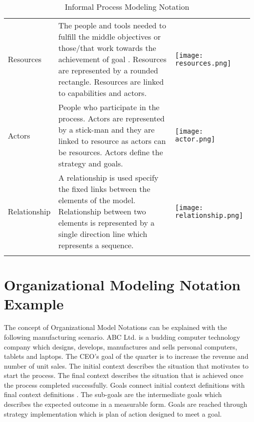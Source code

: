 \begin{center}
\begin{longtable}{p{3cm}p{10cm}p{3cm}}
		Resources					& The people and tools needed to fulfill the middle objectives or those/that work towards the achievement of goal . Resources are represented by a rounded rectangle. Resources are linked to capabilities and actors. & \begin{center} \texttt{[image: resources.png]} \end{center}   \\
		
		Actors					& People who participate in the process. Actors are represented by a stick-man and they are linked to resource as actors can be resources. Actors define the strategy and goals.  & \begin{center} \texttt{[image: actor.png]} \end{center}   \\
		
		Relationship				& A relationship is used specify the fixed links between the elements of the model. Relationship between two elements is represented by a single direction line which represents a sequence.  & \begin{center} \texttt{[image: relationship.png]} \end{center}   \\
		
		
		\bottomrule
		\caption{Informal Process Modeling Notation}
		\label{tab:notations}		
	\end{longtable}	
\end{center}


\section{Organizational Modeling Notation Example}
\hspace{4ex} The concept of Organizational Model Notations can be explained with the following manufacturing scenario. ABC Ltd. is a budding computer technology company which designs, develops, manufactures and sells personal computers, tablets and laptops. The CEO's goal of the quarter is to increase the revenue and number of unit sales. The initial context describes the situation that motivates to start the process. The final context describes the situation that is achieved once the process completed successfully. Goals connect initial context definitions with final context definitions \cite{Sungur2014a}. The sub-goals are the intermediate goals which describes the expected outcome in a measurable form. Goals are reached through strategy implementation which is plan of action designed to meet a goal. 

